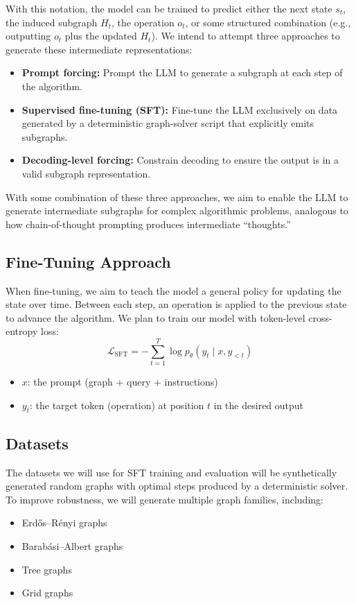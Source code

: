 \documentclass[sigplan,screen]{acmart}
\begin{document}
With this notation, the model can be trained to predict either the next state $s_t$, the induced subgraph $H_t$, the operation $o_t$, or some structured combination (e.g., outputting $o_t$ plus the updated $H_t$). We intend to attempt three approaches to generate these intermediate representations:
\begin{itemize}
  \item \textbf{Prompt forcing:} Prompt the LLM to generate a subgraph at each step of the algorithm.
  \item \textbf{Supervised fine-tuning (SFT):} Fine-tune the LLM exclusively on data generated by a deterministic graph-solver script that explicitly emits subgraphs.
  \item \textbf{Decoding-level forcing:} Constrain decoding to ensure the output is in a valid subgraph representation.
\end{itemize}
With some combination of these three approaches, we aim to enable the LLM to generate intermediate subgraphs for complex algorithmic problems, analogous to how chain-of-thought prompting produces intermediate ``thoughts.''
\subsection{Fine-Tuning Approach}
When fine-tuning, we aim to teach the model a general policy for updating the state over time. Between each step, an operation is applied to the previous state to advance the algorithm. We plan to train our model with token-level cross-entropy loss:
\begin{equation}
  \mathcal{L}_{\mathrm{SFT}} = -\sum_{t=1}^{T} \log p_{\theta}(y_t \mid x, y_{<t})
\end{equation}
\begin{itemize}
  \item $x$: the prompt (graph + query + instructions)
  \item $y_t$: the target token (operation) at position $t$ in the desired output
\end{itemize}
\subsection{Datasets}
The datasets we will use for SFT training and evaluation will be synthetically generated random graphs with optimal steps produced by a deterministic solver. To improve robustness, we will generate multiple graph families, including:
\begin{itemize}
  \item Erd\H{o}s--R\'enyi graphs
  \item Barab\'asi--Albert graphs
  \item Tree graphs
  \item Grid graphs
\end{itemize}
\end{document}
